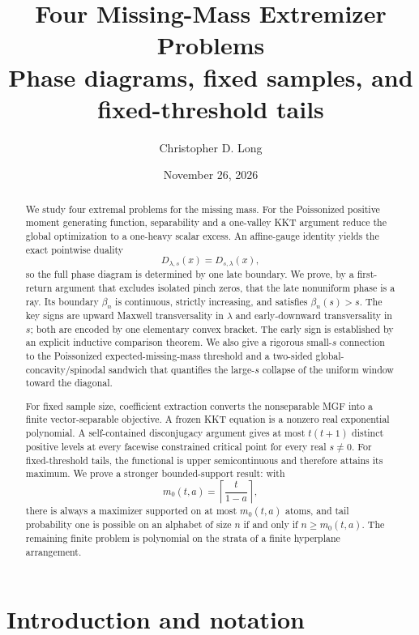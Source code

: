 \documentclass[11pt]{article}
\title{Four Missing-Mass Extremizer Problems\\
\large Phase diagrams, fixed samples, and fixed-threshold tails}
\author{Christopher D. Long}
\date{November 26, 2026}
\theoremstyle{plain}
\theoremstyle{definition}
\theoremstyle{remark}
\begin{document}
\maketitle

\begin{abstract}
We study four extremal problems for the missing mass.  For the Poissonized positive moment generating function, separability and a one-valley KKT argument reduce the global optimization to a one-heavy scalar excess.  An affine-gauge identity yields the exact pointwise duality
\[
D_{\lambda,s}(x)=D_{s,\lambda}(x),
\]
so the full phase diagram is determined by one late boundary.  We prove, by a first-return argument that excludes isolated pinch zeros, that the late nonuniform phase is a ray.  Its boundary \(\beta_n\) is continuous, strictly increasing, and satisfies \(\beta_n(s)>s\).  The key signs are upward Maxwell transversality in \(\lambda\) and early-downward transversality in \(s\); both are encoded by one elementary convex bracket.  The early sign is established by an explicit inductive comparison theorem.  We also give a rigorous small-\(s\) connection to the Poissonized expected-missing-mass threshold and a two-sided global-concavity/spinodal sandwich that quantifies the large-\(s\) collapse of the uniform window toward the diagonal.

For fixed sample size, coefficient extraction converts the nonseparable MGF into a finite vector-separable objective.  A frozen KKT equation is a nonzero real exponential polynomial.  A self-contained disconjugacy argument gives at most \(t(t+1)\) distinct positive levels at every facewise constrained critical point for every real \(s\ne0\).  For fixed-threshold tails, the functional is upper semicontinuous and therefore attains its maximum.  We prove a stronger bounded-support result: with
\[
m_0(t,a)=\left\lceil \frac{t}{1-a}\right\rceil,
\]
there is always a maximizer supported on at most \(m_0(t,a)\) atoms, and tail probability one is possible on an alphabet of size \(n\) if and only if \(n\ge m_0(t,a)\).  The remaining finite problem is polynomial on the strata of a finite hyperplane arrangement.
\end{abstract}

\tableofcontents

\section{Introduction and notation}
\end{document}
